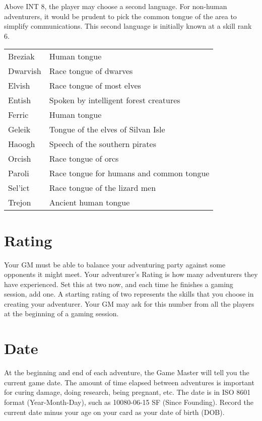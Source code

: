 Above INT 8, the player may choose a second language. For non-human adventurers, it would be prudent to pick the common tongue of the area to simplify communications. This second language is initially known at a skill rank 6.

\begin{normboxc}[Languages]

\small
\begin{tabularx}{\linewidth}{@{} l X }
Breziak & Human tongue\\
Dwarvish & Race tongue of dwarves\\
Elvish & Race tongue of most elves\\
Entish & Spoken by intelligent forest creatures\\
Ferric & Human tongue\\
Geleik & Tongue of the elves of Silvan Isle\\
Haoogh & Speech of the southern pirates\\
Orcish & Race tongue of orcs\\
Paroli & Race tongue for humans and common tongue\\
Sel'ict & Race tongue of the lizard men\\
Trejon & Ancient human tongue\\
\end{tabularx}
\normalsize
\end{normboxc}
\setlength{\columnsep}{0.25cm}
\section{Rating}
Your GM must be able to balance your adventuring party against some opponents it might meet. Your adventurer's Rating is how many adventurers they have experienced. Set this at two now, and each time he finishes a gaming session, add one. A starting rating of two represents the skills that you choose in creating your adventurer. Your GM may ask for this number from all the players at the beginning of a gaming session.
\section{Date}

At the beginning and end of each adventure, the Game Master will tell you the current game date. The amount of time elapsed between adventures is important for curing damage, doing research, being pregnant, etc. The date is in ISO 8601 format (Year-Month-Day), such as 10080-06-15 SF (Since Founding). Record the current date minus your age on your card as your date of birth (DOB).
